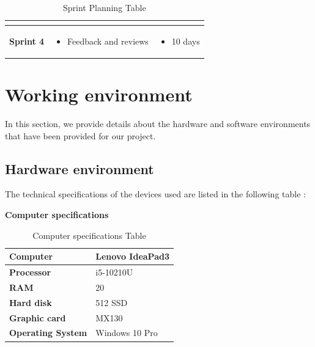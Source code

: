 \begin{table}[H]
\begin{tabular}{|p{}|p{}|p{}|}
\begin{itemize}[left=0pt,label={\textbf{-}}]
       \end{itemize} \\ \hline
       \centering
       \textbf{Sprint 4}  &  
       \begin{itemize}[left=0pt,label={\textbf{-}}]
           \item Feedback and reviews
       \end{itemize}
       &  \begin{itemize}[left=0pt,label={\textbf{-}}]
           \item  10 days
       \end{itemize} \\ \hline

       
       
\end{tabular}
     \caption{Sprint Planning Table}
    \label{tab:my_label}
     \setlength{\abovecaptionskip}{0.25cm}
\end{table}


\section{Working environment}

In this section, we provide details about the hardware and software environments that have been provided for our project.


\subsection{Hardware environment }
The technical specifications of the devices used are listed in the following table : 
\vspace{0.25cm}
\newpage
\begin{large}
    \textbf{Computer specifications}
\end{large}
\vspace{0.25cm}

\begin{table}[H]
    \renewcommand{\arraystretch}{1.5}
   \begin{tabular}{|p{}|p{}|}
   \hline
    
       \textbf{Computer} & Lenovo IdeaPad3 \\ \hline
       \textbf{Processor} & i5-10210U  \\ \hline
       \textbf{RAM} & 20 \\ \hline
       \textbf{Hard disk} & 512 SSD \\ \hline
       \textbf{Graphic card} & MX130  \\ \hline
       \textbf{Operating System} &Windows 10 Pro \\ \hline

\end{tabular}
     \caption{Computer specifications Table}
    \label{tab:my_label}
\end{table}

